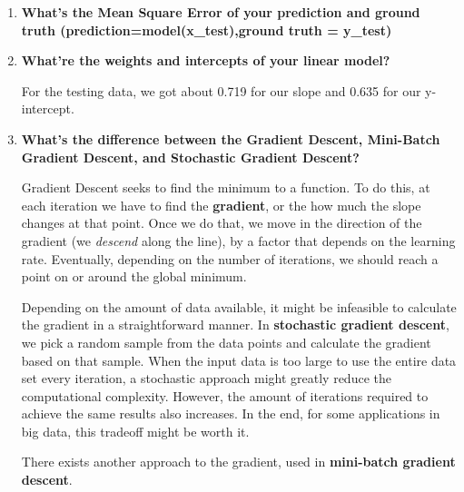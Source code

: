 \documentclass{article}
\begin{document}
\begin{enumerate}
\begin{figure}[!ht]
\begin{subfigure}{0.4\linewidth}
					\end{subfigure}
				\end{figure}

		\item \textbf{What's the Mean Square Error of your prediction and ground truth
				(prediction=model(x\_test),ground truth = y\_test)}

		\item \textbf{What're the weights and intercepts of your linear model?}

				For the testing data, we got about 0.719 for our slope and 0.635 for our 
				y-intercept.

		\item \textbf{What's the difference between the Gradient Descent, Mini-Batch Gradient
				Descent, and Stochastic Gradient Descent?}
				
				Gradient Descent seeks to find the minimum to a function. To do this, at each 
				iteration we have to find the \textbf{gradient}, or the how much the slope changes
				at that point. Once we do that, we move in the direction of the gradient (we 
				\textit{descend} along the line), by a factor that depends on the learning rate.
				Eventually, depending on the number of iterations, we should reach a point 
				on or around the global minimum.

				Depending on the amount of data available, it might be infeasible to calculate
				the gradient in a straightforward manner. In \textbf{stochastic gradient descent},
				we pick a random sample from the data points and calculate the gradient based on that
				sample. When the input data is too large to use the entire data set every iteration,
				a stochastic approach might greatly reduce the computational complexity. However,
				the amount of iterations required to achieve the same results also increases. In the end,
				for some applications in big data, this tradeoff might be worth it.

				There exists another approach to the gradient, used in \textbf{mini-batch gradient descent}.

\end{enumerate}
\end{document}
